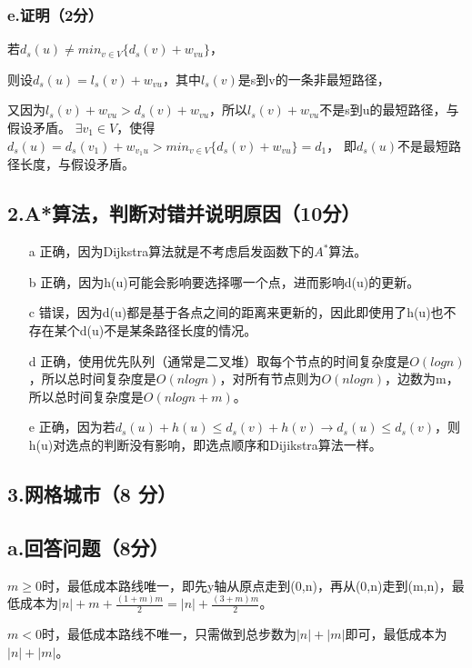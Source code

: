 \documentclass{article}
\begin{document}
\subsubsection*{e.证明（2分）}

若$d_s(u)\neq min_{v \in V}\{d_s(v)+w_{vu}\}$，

则设$d_s(u)=l_s(v)+w_{vu}$，其中$l_s(v)$是s到v的一条非最短路径，

又因为$l_s(v)+w_{vu}>d_s(v)+w_{vu}$，所以$l_s(v)+w_{vu}$不是s到u的最短路径，与假设矛盾。
$\exists v_1 \in V$，使得$d_s(u)=d_s(v_1)+w_{v_1u}>min_{v \in V}\{d_s(v)+w_{vu}\}=d_1$，
即$d_s(u)$不是最短路径长度，与假设矛盾。

\subsection*{2.A*算法，判断对错并说明原因（10分）}

\begin{enumerate}
    \item[a] 正确，因为Dijkstra算法就是不考虑启发函数下的$A^*$算法。
    \item[b] 正确，因为h(u)可能会影响要选择哪一个点，进而影响d(u)的更新。
    \item[c] 错误，因为d(u)都是基于各点之间的距离来更新的，因此即使用了h(u)也不存在某个d(u)不是某条路径长度的情况。
    \item[d] 正确，使用优先队列（通常是二叉堆）取每个节点的时间复杂度是$O(logn)$，所以总时间复杂度是$O(nlogn)$，对所有节点则为$O(nlogn)$，边数为m，所以总时间复杂度是$O(nlogn+m)$。
    \item[e] 正确，因为若$d_s(u) + h(u)\leqslant  d_s(v) + h(v)\rightarrow d_s(u)\leqslant  d_s(v)$，则h(u)对选点的判断没有影响，即选点顺序和Dijikstra算法一样。
\end{enumerate}

\subsection*{3.网格城市（8 分）}

\subsection*{a.回答问题（8分）}

$m \geqslant 0$时，最低成本路线唯一，即先y轴从原点走到(0,n)，再从(0,n)走到(m,n)，最低成本为$\lvert n \rvert+m+\frac{(1+m)m}{2}=\lvert n \rvert+\frac{(3+m)m}{2}$。

$m < 0$时，最低成本路线不唯一，只需做到总步数为$\lvert n \rvert+\lvert m \rvert$即可，最低成本为$\lvert n \rvert+\lvert m \rvert$。
\end{document}

